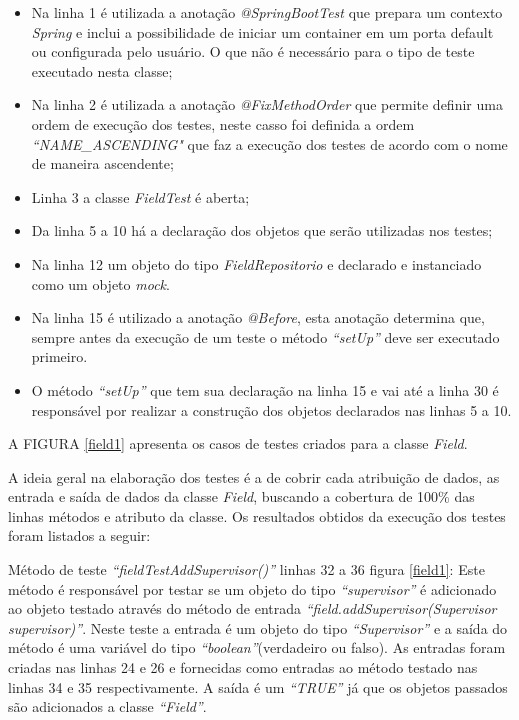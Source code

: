 \begin{itemize}

\item Na linha 1 é utilizada a anotação \textit{@SpringBootTest} que prepara um contexto \textit{Spring} e inclui a possibilidade de iniciar um container em um porta default ou configurada pelo usuário. O que não é necessário para o tipo de teste executado nesta classe; 

 \item Na linha 2 é utilizada a anotação \textit{@FixMethodOrder} que permite definir uma ordem de execução dos testes, neste casso foi definida a ordem \textit{“NAME\_ASCENDING"} que faz a execução dos testes de acordo com o nome de maneira ascendente;

 \item Linha 3 a classe \textit{FieldTest} é aberta;

 \item Da linha 5 a 10 há a declaração dos objetos que serão utilizadas nos testes;
 
  \item Na linha 12 um objeto do tipo \textit{FieldRepositorio} e declarado e instanciado como um objeto \textit{mock}.

 \item Na linha 15 é utilizado a anotação \textit{@Before}, esta anotação determina que, sempre antes da execução de um teste o método \textit{“setUp”} deve ser executado primeiro.

 \item O método \textit{“setUp”} que tem sua declaração na linha 15 e vai até a linha 30 é responsável por realizar a construção dos objetos declarados nas linhas 5 a 10.


\end{itemize}{}



A FIGURA \ref{field1} apresenta os casos de testes criados para a classe \textit{Field}. 


A ideia geral na elaboração dos testes é a de cobrir cada atribuição de dados, as entrada e saída de dados da classe \textit{Field}, buscando a cobertura de 100\% das linhas métodos e atributo da classe. Os resultados obtidos da execução dos testes foram listados a seguir:

Método de teste \textit{“fieldTestAddSupervisor()”} linhas 32 a 36 figura \ref{field1}: Este método é responsável por testar se um objeto do tipo\textit{ “supervisor”} é adicionado ao objeto testado através do método de entrada \textit{“field.addSupervisor(Supervisor supervisor)”}.  Neste teste a entrada é um objeto do tipo \textit{“Supervisor” }e a saída do método é uma variável do tipo \textit{“boolean”}(verdadeiro ou falso).  As entradas foram criadas nas linhas 24 e 26 e fornecidas como entradas ao método testado nas linhas 34 e 35 respectivamente. A saída é um \textit{“TRUE”} já que os objetos passados são adicionados a classe\textit{ “Field”}. 



